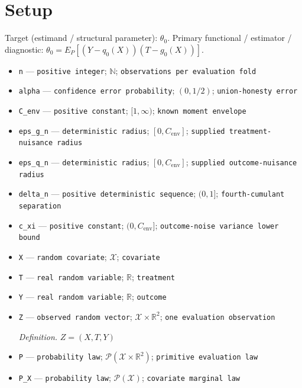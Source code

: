 \documentclass{article}
\begin{document}
\section{Setup}

Target (estimand / structural parameter): \(\theta_0\).
Primary functional / estimator / diagnostic: \(\theta_0=E_P[(Y-q_0(X))(T-g_0(X))]\).
\begin{itemize}
  \item \texttt{n} --- \texttt{positive integer}; \(\mathbb N\); \texttt{observations per evaluation fold}
  \item \texttt{alpha} --- \texttt{confidence error probability}; \((0,1/2)\); \texttt{union-\allowbreak{}honesty error}
  \item \texttt{C\_\allowbreak{}env} --- \texttt{positive constant}; \([1,\infty)\); \texttt{known moment envelope}
  \item \texttt{eps\_\allowbreak{}g\_\allowbreak{}n} --- \texttt{deterministic radius}; \([0,C_{\mathrm{env}}]\); \texttt{supplied treatment-\allowbreak{}nuisance radius}
  \item \texttt{eps\_\allowbreak{}q\_\allowbreak{}n} --- \texttt{deterministic radius}; \([0,C_{\mathrm{env}}]\); \texttt{supplied outcome-\allowbreak{}nuisance radius}
  \item \texttt{delta\_\allowbreak{}n} --- \texttt{positive deterministic sequence}; \((0,1]\); \texttt{fourth-\allowbreak{}cumulant separation}
  \item \texttt{c\_\allowbreak{}xi} --- \texttt{positive constant}; \((0,C_{\mathrm{env}}]\); \texttt{outcome-\allowbreak{}noise variance lower bound}
  \item \texttt{X} --- \texttt{random covariate}; \(\mathcal X\); \texttt{covariate}
  \item \texttt{T} --- \texttt{real random variable}; \(\mathbb R\); \texttt{treatment}
  \item \texttt{Y} --- \texttt{real random variable}; \(\mathbb R\); \texttt{outcome}
  \item \texttt{Z} --- \texttt{observed random vector}; \(\mathcal X\times\mathbb R^2\); \texttt{one evaluation observation}
  \par\smallskip\noindent\emph{Definition.} \(Z=(X,T,Y)\)
  \item \texttt{P} --- \texttt{probability law}; \(\mathcal P(\mathcal X\times\mathbb R^2)\); \texttt{primitive evaluation law}
  \item \texttt{P\_\allowbreak{}X} --- \texttt{probability law}; \(\mathcal P(\mathcal X)\); \texttt{covariate marginal law}

\end{itemize}
\end{document}
